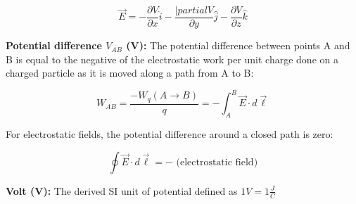         \[
            \vec{E} = -\frac{\partial V}{\partial x}\hat{i} - \frac{|partial V}{\partial y}\hat{j} - \frac{\partial V}{\partial z} \hat{k}
        \]

        \textbf{Potential difference $V_{AB}$ (V):} The potential difference between points A and B is equal to the negative of the electrostatic work per unit charge done on a charged particle as it is moved along a
        path from A to B:

        \[
            W_{AB} = \frac{-W_q (A\to B)}{q} = -\int_A^B \vec{E}\cdot d\vec{\ell}
        \]

        For electrostatic fields, the potential difference around a closed path is zero:

        \[
            \oint \vec{E}\cdot d\vec{\ell} = - \text{ (electrostatic field)}
        \]

        \textbf{Volt (V):} The derived SI unit of potential defined as $1V = 1 \frac{J}{C}$